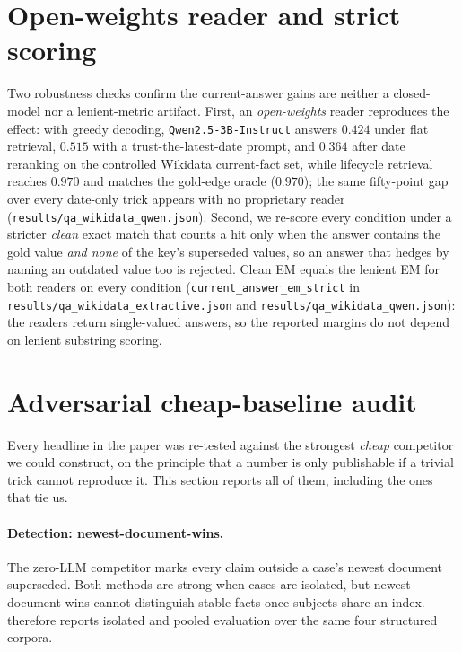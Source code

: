 \documentclass[letterpaper]{article}
\begin{document}
\section{Open-weights reader and strict scoring}
\label{sec:supp_openweights}
Two robustness checks confirm the current-answer gains are neither a closed-model nor a lenient-metric artifact. First, an \emph{open-weights} reader reproduces the effect: with greedy decoding, \texttt{Qwen2.5-3B-Instruct} answers $0.424$ under flat retrieval, $0.515$ with a trust-the-latest-date prompt, and $0.364$ after date reranking on the controlled Wikidata current-fact set, while lifecycle retrieval reaches $0.970$ and matches the gold-edge oracle ($0.970$); the same fifty-point gap over every date-only trick appears with no proprietary reader (\texttt{results/qa\_wikidata\_qwen.json}). Second, we re-score every condition under a stricter \emph{clean} exact match that counts a hit only when the answer contains the gold value \emph{and none} of the key's superseded values, so an answer that hedges by naming an outdated value too is rejected. Clean EM equals the lenient EM for both readers on every condition (\texttt{current\_answer\_em\_strict} in \texttt{results/qa\_wikidata\_extractive.json} and \texttt{results/qa\_wikidata\_qwen.json}): the readers return single-valued answers, so the reported margins do not depend on lenient substring scoring.

\section{Adversarial cheap-baseline audit}
\label{sec:supp_adversarial}
Every headline in the paper was re-tested against the strongest \emph{cheap} competitor we could construct, on the principle that a number is only publishable if a trivial trick cannot reproduce it. This section reports all of them, including the ones that tie us.

\paragraph{Detection: newest-document-wins.} The zero-LLM competitor marks every claim outside a case's newest document superseded. Both methods are strong when cases are isolated, but newest-document-wins cannot distinguish stable facts once subjects share an index.  therefore reports isolated and pooled evaluation over the same four structured corpora.
\end{document}
